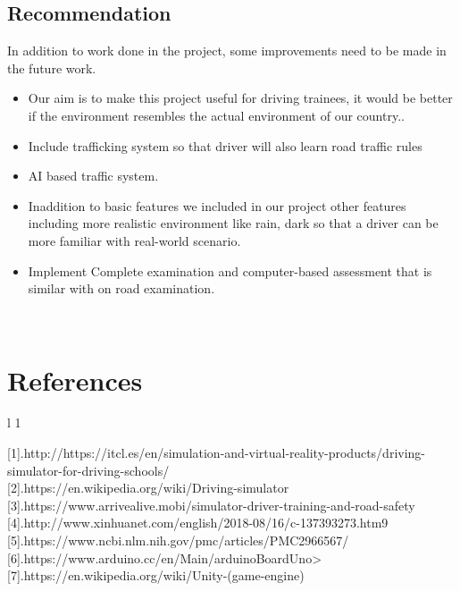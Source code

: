 \documentclass[12pt,a4paper]{article}
\begin{document}
\begin{center}
\begin{center}
\begin{center}
\begin{itemize}
\subsection{Recommendation}
In addition to work done in the project, some improvements need to be made in the future work.
\begin{itemize}
	\item 
Our aim is to make this project useful for driving trainees, it would be better if the environment resembles the actual environment of our country.. 
\item Include trafficking system so that driver will also learn road traffic rules
	\item AI based traffic system.
	\item Inaddition to basic features we included in our project other features including  more realistic environment like rain, dark so that a driver can be more familiar with real-world scenario.
	\item Implement Complete examination and computer-based assessment that is similar with on road examination.
\end{itemize}
\\
\section*{References}

\begin{tabular}{l 1}
	
	[1].http://https://itcl.es/en/simulation-and-virtual-reality-products/driving-simulator-for-driving-schools/\\
	
	[2].https://en.wikipedia.org/wiki/Driving-simulator\\
	
	[3].https://www.arrivealive.mobi/simulator-driver-training-and-road-safety\\
	
	[4].http://www.xinhuanet.com/english/2018-08/16/c-137393273.htm9\\
	
	[5].https://www.ncbi.nlm.nih.gov/pmc/articles/PMC2966567/\\
	
	[6].https://www.arduino.cc/en/Main/arduinoBoardUno>\\
	
	[7].https://en.wikipedia.org/wiki/Unity-(game-engine)\\
	

\end{tabular}
\end{itemize}
\end{center}
\end{center}
\end{center}
\end{document}

